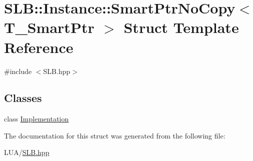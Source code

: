 \hypertarget{structSLB_1_1Instance_1_1SmartPtrNoCopy}{}\section{S\+LB\+:\+:Instance\+:\+:Smart\+Ptr\+No\+Copy$<$ T\+\_\+\+Smart\+Ptr $>$ Struct Template Reference}
\label{structSLB_1_1Instance_1_1SmartPtrNoCopy}


{\ttfamily \#include $<$S\+L\+B.\+hpp$>$}

\subsection*{Classes}
\begin{DoxyCompactItemize}
\item 
class \hyperlink{classSLB_1_1Instance_1_1SmartPtrNoCopy_1_1Implementation}{Implementation}
\end{DoxyCompactItemize}


The documentation for this struct was generated from the following file\+:\begin{DoxyCompactItemize}
\item 
L\+U\+A/\hyperlink{SLB_8hpp}{S\+L\+B.\+hpp}\end{DoxyCompactItemize}

